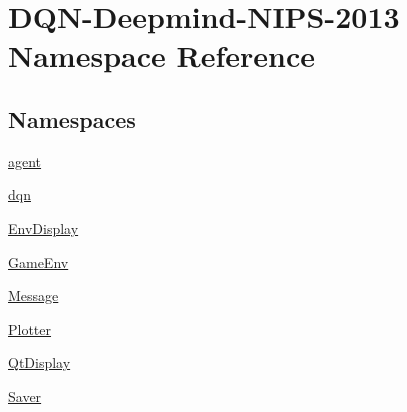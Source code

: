 \hypertarget{namespaceDQN-Deepmind-NIPS-2013}{}\section{D\+Q\+N-\/\+Deepmind-\/\+N\+I\+P\+S-\/2013 Namespace Reference}
\label{namespaceDQN-Deepmind-NIPS-2013}
\subsection*{Namespaces}
\begin{DoxyCompactItemize}
\item 
 \hyperlink{namespaceDQN-Deepmind-NIPS-2013_1_1agent}{agent}
\item 
 \hyperlink{namespaceDQN-Deepmind-NIPS-2013_1_1dqn}{dqn}
\item 
 \hyperlink{namespaceDQN-Deepmind-NIPS-2013_1_1EnvDisplay}{Env\+Display}
\item 
 \hyperlink{namespaceDQN-Deepmind-NIPS-2013_1_1GameEnv}{Game\+Env}
\item 
 \hyperlink{namespaceDQN-Deepmind-NIPS-2013_1_1Message}{Message}
\item 
 \hyperlink{namespaceDQN-Deepmind-NIPS-2013_1_1Plotter}{Plotter}
\item 
 \hyperlink{namespaceDQN-Deepmind-NIPS-2013_1_1QtDisplay}{Qt\+Display}
\item 
 \hyperlink{namespaceDQN-Deepmind-NIPS-2013_1_1Saver}{Saver}
\end{DoxyCompactItemize}
